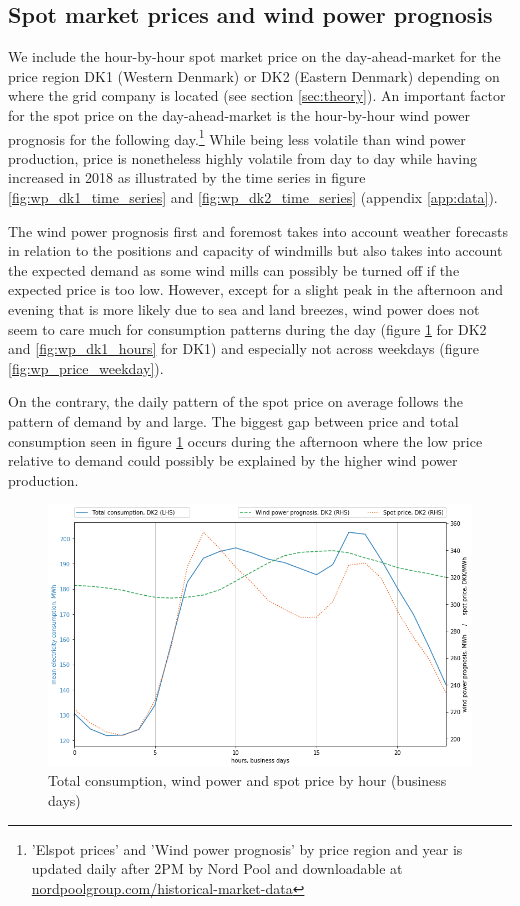 \subsection{Spot market prices and wind power prognosis}
\label{subsec:d_spot}
We include the hour-by-hour spot market price on the day-ahead-market for the price region DK1 (Western Denmark) or DK2 (Eastern Denmark) depending on where the grid company is located (see section \ref{sec:theory}). An important factor for the spot price on the day-ahead-market is the hour-by-hour wind power prognosis for the following day.\footnote{'Elspot prices' and 'Wind power prognosis' by price region and year is updated daily after 2PM by Nord Pool and downloadable at \href{https://www.nordpoolgroup.com/historical-market-data/}{nordpoolgroup.com/historical-market-data}} While being less volatile than wind power production, price is nonetheless highly volatile from day to day while having increased in 2018 as illustrated by the time series in figure \ref{fig:wp_dk1_time_series} and \ref{fig:wp_dk2_time_series} (appendix \ref{app:data}).
\bigskip\par
The wind power prognosis first and foremost takes into account weather forecasts in relation to the positions and capacity of windmills but also takes into account the expected demand as some wind mills can possibly be turned off if the expected price is too low. However, except for a slight peak in the afternoon and evening that is more likely due to sea and land breezes, wind power does not seem to care much for consumption patterns during the day (figure \ref{fig:trio_DK2_hours} for DK2 and \ref{fig:wp_dk1_hours} for DK1) and especially not across weekdays (figure \ref{fig:wp_price_weekday}).
\par
On the contrary, the daily pattern of the spot price on average follows the pattern of demand by and large. The biggest gap between price and total consumption seen in figure \ref{fig:trio_DK2_hours} occurs during the afternoon where the low price relative to demand could possibly be explained by the higher wind power production.
\begin{figure}[H]
  \centering
  \caption{Total consumption, wind power and spot price by hour (business days)}
  \label{fig:trio_DK2_hours}
    \includegraphics[width=1 \textwidth]{03_figures/trio_DK2_hours, business days}
\end{figure}


